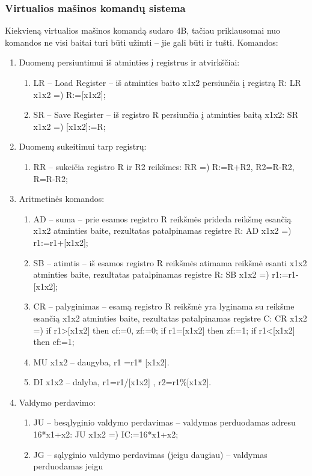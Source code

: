 \documentclass[oneside]{VUMIFPSkursinis}
\begin{document}
	\subsubsection{Virtualios mašinos komandų sistema}
Kiekvieną virtualios mašinos komandą sudaro 4B, tačiau priklausomai nuo komandos ne visi
baitai turi būti užimti – jie gali būti ir tušti.
Komandos:
\begin{enumerate}
\item Duomenų persiuntimui iš atminties į registrus ir atvirkščiai:
\begin{enumerate}
\item  LR – Load Register – iš atminties baito x1x2 persiunčia į registrą R:
LR x1x2 =) R:=[x1x2];
\item SR – Save Register – iš registro R persiunčia į atminties baitą x1x2:
SR x1x2 =) [x1x2]:=R;
\end{enumerate}
\item Duomenų sukeitimui tarp registrų:
\begin{enumerate}
\item RR – sukeičia registro R ir R2 reikšmes:
RR =) R:=R+R2, R2=R-R2, R=R-R2;
\end{enumerate}
\item Aritmetinės komandos:
\begin{enumerate}
\item AD – suma – prie esamos registro R reikšmės prideda reikšmę esančią x1x2 atminties
baite, rezultatas patalpinamas registre R:
AD x1x2 =) r1:=r1+[x1x2];
\item SB – atimtis – iš esamos registro R reikšmės atimama reikšmė esanti x1x2 atminties
baite, rezultatas patalpinamas registre R:
SB x1x2 =) r1:=r1-[x1x2];
\item CR – palyginimas – esamą registro R reikšmė yra lyginama su reikšme esančią x1x2
atminties baite, rezultatas patalpinamas registre C:
CR x1x2 =)
if r1>[x1x2] then cf:=0, zf:=0;
if r1=[x1x2] then zf:=1;
if r1<[x1x2] then cf:=1;
\item MU x1x2 – daugyba, r1 =r1* [x1x2].
\item DI x1x2 – dalyba, r1=r1/[x1x2] , r2=r1\%[x1x2].
\end{enumerate}
\item Valdymo perdavimo:
\begin{enumerate}
\item JU – besąlyginio valdymo perdavimas – valdymas perduodamas adresu 16*x1+x2:
JU x1x2 =) IC:=16*x1+x2;
\item JG – sąlyginio valdymo perdavimas (jeigu daugiau) – valdymas perduodamas jeigu

\end{enumerate}
\end{enumerate}
\end{document}
